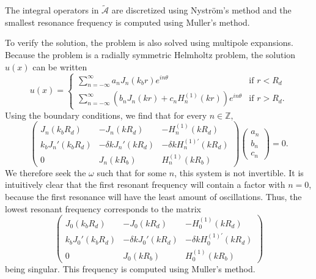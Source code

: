 \documentclass[a4paper]{article}
\theoremstyle{definition}
\newcommand{\Z}{\mathbb{Z}}
\begin{document}
The integral operators in $\tilde{\mathcal{A}}$ are discretized using Nyström's method and the smallest resonance frequency is computed using Muller's method. \cite{first}

To verify the solution, the problem is also solved using multipole expansions. Because the problem is a radially symmetric Helmholtz problem, the solution $u(x)$ can be written
\begin{equation*}
u(x) = \begin{cases}
\sum_{n=-\infty}^\infty a_n J_n(k_br)e^{in\theta} \quad &\text{if } r<R_d \\
\sum_{n=-\infty}^\infty \left(b_n J_n(kr) + c_n H^{(1)}_n(kr)\right) e^{in\theta}  &\text{if } r>R_d.
\end{cases}
\end{equation*}
Using the boundary conditions, we find that for every $n\in \Z$,
\begin{equation*} 
\begin{pmatrix}
J_n(k_bR_d) &  -J_n(kR_d) & -H_n^{(1)}(kR_d) \\
k_bJ_n'(k_bR_d) & -\delta kJ_n'(kR_d) & -\delta k H^{(1)'}_n(kR_d)\\
0 & J_n(kR_b) & H^{(1)}_n(kR_b)
\end{pmatrix}
\begin{pmatrix}
a_n \\ b_n \\ c_n
\end{pmatrix} = 0.
\end{equation*}
We therefore seek the $\omega$ such that for some $n$, this system is not invertible. It is intuitively clear that the first resonant frequency will contain a factor with $n=0$, because the first resonance will have the least amount of oscillations. Thus, the lowest resonant frequency corresponds to the matrix
\begin{equation*} 
\begin{pmatrix}
J_0(k_bR_d) &  -J_0(kR_d) & -H_0^{(1)}(kR_d) \\
k_bJ_0'(k_bR_d) & -\delta kJ_0'(kR_d) & -\delta k H^{(1)'}_0(kR_d)\\
0 & J_0(kR_b) & H^{(1)}_0(kR_b)
\end{pmatrix}
\end{equation*}
being singular. This frequency is computed using Muller's method.
\end{document}
